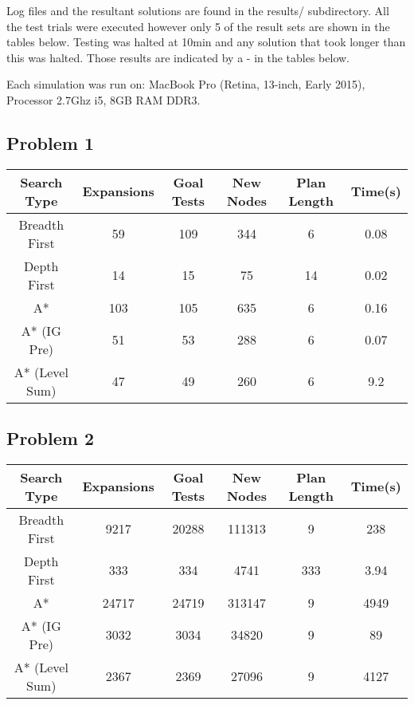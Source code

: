 \documentclass[paper=letter, fontsize=12pt]{article}
\begin{document}
Log files and the resultant solutions are found in the results/ subdirectory. All the test trials were executed however only 5 of the result sets are shown in the tables below. Testing was halted at 10min and any solution that took longer than this was halted. Those results are indicated by a - in the tables below.

Each simulation was run on:
MacBook Pro (Retina, 13-inch, Early 2015), Processor 2.7Ghz i5, 8GB RAM DDR3.

\subsection{Problem 1}
\begin{center}
\begin{tabular}{ |c|c|c|c|c|c| }
 \hline
 Search Type & Expansions & Goal Tests & New Nodes & Plan Length & Time(s) \\
 \hline
 Breadth First & 59 & 109 & 344 & 6 & 0.08 \\
 Depth First & 14 & 15 & 75 & 14 & 0.02 \\
 A* & 103 & 105 & 635 & 6 & 0.16 \\
 A* (IG Pre) & 51 & 53 & 288 & 6 & 0.07 \\
 A* (Level Sum) & 47 & 49 & 260 & 6 & 9.2 \\
 \hline
\end{tabular}
\end{center}

\subsection{Problem 2}
\begin{center}
\begin{tabular}{ |c|c|c|c|c|c| }
 \hline
 Search Type & Expansions & Goal Tests & New Nodes & Plan Length & Time(s) \\
 \hline
 Breadth First & 9217 & 20288 & 111313 & 9 & 238 \\
 Depth First & 333 & 334 & 4741 & 333 & 3.94 \\
 A* & 24717 & 24719 & 313147 & 9 & 4949 \\
 A* (IG Pre) & 3032 & 3034 & 34820 & 9 & 89 \\
 A* (Level Sum) & 2367 & 2369 & 27096 & 9 & 4127\\
 \hline
\end{tabular}
\end{center}
\end{document}
